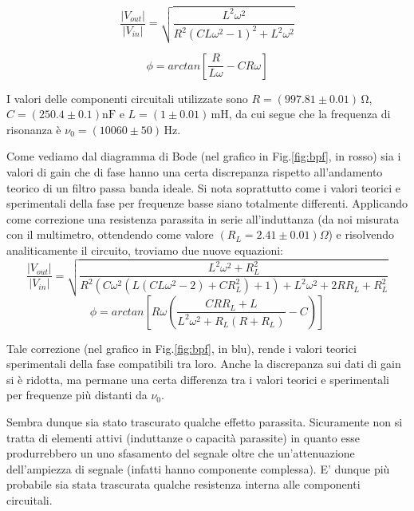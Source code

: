 \begin{equation}
\frac{|V_{out}|}{|V_{in}|}=\sqrt{\frac{L^2 \omega ^2}{R^2 \left(C L \omega ^2-1\right)^2+L^2 \omega ^2}}
\label{eq:bpfGain}
\end{equation}

\begin{equation}
\phi=arctan\left[\frac{R}{L \omega}-C R \omega \right]
\label{eq:bpfPhi}
\end{equation}

\noindent I valori delle componenti circuitali utilizzate sono $R=(997.81 \pm 0.01)\,\si{\ohm}$, $C=(250.4 \pm 0.1)\si{\nano\farad}$ e $L=(1 \pm 0.01)\,\si{\milli\henry}$, da cui segue che la frequenza di risonanza è $\nu_0 = (10060 \pm 50)\,\si{\hertz}$.

Come vediamo dal diagramma di Bode (nel grafico in Fig.\ref{fig:bpf}, in rosso) sia i valori di gain che di fase hanno una certa discrepanza rispetto all'andamento teorico di un filtro passa banda ideale. Si nota soprattutto come i valori teorici e sperimentali della fase per frequenze basse siano totalmente differenti.
Applicando come correzione una resistenza parassita in serie all'induttanza (da noi misurata con il multimetro, ottendendo come valore $(R_L=2.41\pm 0.01) \Omega$) e risolvendo analiticamente il circuito, troviamo due nuove equazioni:\\

\noindent
\begin{equation}
\frac{|V_{out}|}{|V_{in}|}=\sqrt{\frac{L^2 \omega ^2+R_L^2}{R^2 \left(C \omega ^2 \left(L \left(C L \omega ^2-2\right)+C R_L^2\right)+1\right)+L^2 \omega ^2+2 R R_L+R_L^2}}
\label{bpfGain_corr}
\end{equation}
\begin{equation}
\phi=arctan\left[R \omega \left(\frac{C R R_L+L}{L^2 \omega ^2+R_L (R+R_L)}-C\right)\right]
\label{bpfPhi_corr}
\end{equation}
\break

\noindent Tale correzione (nel grafico in Fig.\ref{fig:bpf}, in blu), rende i valori teorici sperimentali della fase compatibili tra loro. Anche la discrepanza sui dati di gain si è ridotta, ma permane una certa differenza tra i valori teorici e sperimentali per frequenze più distanti da $\nu_0$.

Sembra dunque sia stato trascurato qualche effetto parassita. Sicuramente non si tratta di elementi attivi (induttanze o capacità parassite) in quanto esse produrrebbero un uno sfasamento del segnale oltre che un'attenuazione dell'ampiezza di segnale (infatti hanno componente complessa). E' dunque più probabile sia stata trascurata qualche resistenza interna alle componenti circuitali.